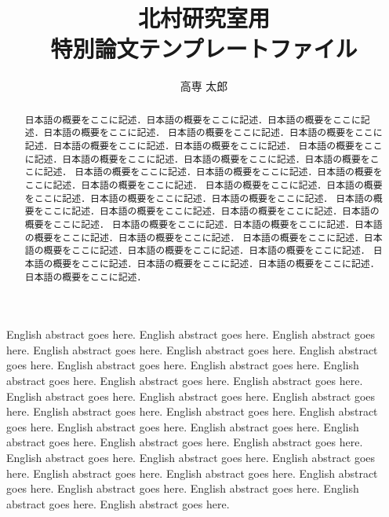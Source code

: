 \documentclass[senkouka]{nitkagawathesis}%
\title{北村研究室用\\特別論文テンプレートファイル}
\author{高専 太郎}
\begin{document}

\maketitle%

\frontmatter


\begin{eabstract} %
  English abstract goes here. English abstract goes here. English abstract goes here. English abstract goes here.
  English abstract goes here. English abstract goes here. English abstract goes here. English abstract goes here.
  English abstract goes here. English abstract goes here. English abstract goes here. English abstract goes here.
  English abstract goes here. English abstract goes here. English abstract goes here. English abstract goes here.
  English abstract goes here. English abstract goes here. English abstract goes here. English abstract goes here.
  English abstract goes here. English abstract goes here. English abstract goes here. English abstract goes here.
  English abstract goes here. English abstract goes here. English abstract goes here. English abstract goes here.
  English abstract goes here. English abstract goes here. English abstract goes here. English abstract goes here.
\end{eabstract}

\begin{abstract} %
  日本語の概要をここに記述．日本語の概要をここに記述．日本語の概要をここに記述．日本語の概要をここに記述．
  日本語の概要をここに記述．日本語の概要をここに記述．日本語の概要をここに記述．日本語の概要をここに記述．
  日本語の概要をここに記述．日本語の概要をここに記述．日本語の概要をここに記述．日本語の概要をここに記述．
  日本語の概要をここに記述．日本語の概要をここに記述．日本語の概要をここに記述．日本語の概要をここに記述．
  日本語の概要をここに記述．日本語の概要をここに記述．日本語の概要をここに記述．日本語の概要をここに記述．
  日本語の概要をここに記述．日本語の概要をここに記述．日本語の概要をここに記述．日本語の概要をここに記述．
  日本語の概要をここに記述．日本語の概要をここに記述．日本語の概要をここに記述．日本語の概要をここに記述．
  日本語の概要をここに記述．日本語の概要をここに記述．日本語の概要をここに記述．日本語の概要をここに記述．
  日本語の概要をここに記述．日本語の概要をここに記述．日本語の概要をここに記述．日本語の概要をここに記述．
\end{abstract}
\end{document}
